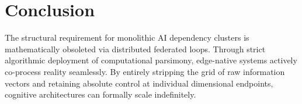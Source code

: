 \documentclass[12pt, a4paper]{article}
\theoremstyle{plain}
\theoremstyle{definition}
\begin{document}
\section{Conclusion}
The structural requirement for monolithic AI dependency clusters is mathematically obsoleted via distributed federated loops. Through strict algorithmic deployment of computational parsimony, edge-native systems actively co-process reality seamlessly. By entirely stripping the grid of raw information vectors and retaining absolute control at individual dimensional endpoints, cognitive architectures can formally scale indefinitely.




\vspace{3em}
\noindent\hrulefill
\end{document}
